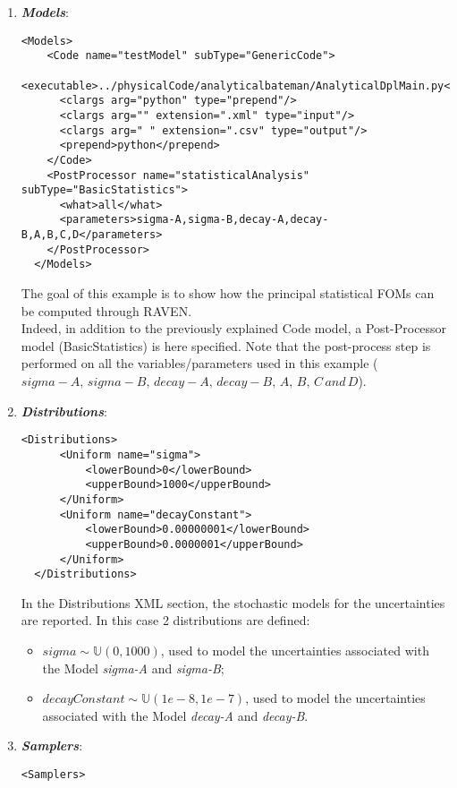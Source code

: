 \begin{enumerate}
   \item \textbf{\textit{Models}}:
\begin{lstlisting}[style=XML,morekeywords={arg,extension,pauseAtEnd,overwrite}]
  <Models>
    <Code name="testModel" subType="GenericCode">
      <executable>../physicalCode/analyticalbateman/AnalyticalDplMain.py</executable>
      <clargs arg="python" type="prepend"/>
      <clargs arg="" extension=".xml" type="input"/>
      <clargs arg=" " extension=".csv" type="output"/>
      <prepend>python</prepend>
    </Code>
    <PostProcessor name="statisticalAnalysis" subType="BasicStatistics">
      <what>all</what>
      <parameters>sigma-A,sigma-B,decay-A,decay-B,A,B,C,D</parameters>
    </PostProcessor>
  </Models>
\end{lstlisting}
 The goal of this example is to show how the 
 principal statistical FOMs can be computed through RAVEN.
 \\Indeed, in addition to the previously explained Code 
 model, a Post-Processor model (BasicStatistics) is here specified. 
Note that the post-process step is
performed on all the variables/parameters used in this example ( $sigma-A,\,sigma-B,\, decay-A, \, decay-B,\, A,\, B,\, C \, and \, D$). 
   \item \textbf{\textit{Distributions}}:
\begin{lstlisting}[style=XML]
  <Distributions>
      <Uniform name="sigma">
          <lowerBound>0</lowerBound>
          <upperBound>1000</upperBound>
      </Uniform>
      <Uniform name="decayConstant">
          <lowerBound>0.00000001</lowerBound>
          <upperBound>0.0000001</upperBound>
      </Uniform>
  </Distributions>
\end{lstlisting}
  In the Distributions XML section, the stochastic models for the 
  uncertainties are reported. In 
  this case 2 distributions are defined: 
  \begin{itemize}
    \item $sigma \sim \mathbb{U}(0,1000)$, used to model the uncertainties 
    associated with  the Model \textit{sigma-A} and \textit{sigma-B};
    \item  $decayConstant \sim \mathbb{U}(1e-8,1e-7)$,  used to 
    model the uncertainties 
    associated with  the Model \textit{decay-A} and \textit{decay-B}.
  \end{itemize}
   \item \textbf{\textit{Samplers}}:
\begin{lstlisting}[style=XML,morekeywords={arg,extension,pauseAtEnd,overwrite}]
  <Samplers>

\end{lstlisting}
\end{enumerate}
